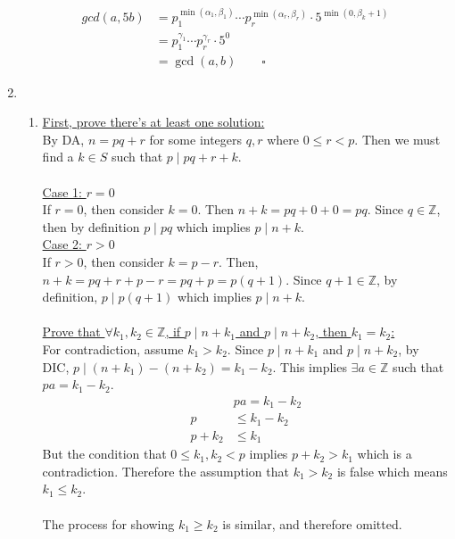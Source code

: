 \documentclass[10pt]{article}
\begin{document}
\begin{enumerate}
    \begin{align*}
        gcd{(a, 5b)} &= p_1^{\min{(\alpha_1, \beta_1)}} \cdots p_r^{\min{(\alpha_r, \beta_r)}} \cdot 5^{\min{(0, \beta_k + 1)}} \\
                    &=  p_1^{\gamma_1} \cdots p_r^{\gamma_r} \cdot 5^0\\
                    &= \gcd{(a, b)} \qquad \square
    \end{align*} 
    \item
    \begin{enumerate}
\item
    \underline{First, prove there's at least one solution:}\\
    By DA, $n = pq + r$ for some integers $q, r$ where $0 \leq r < p$. Then we must find a $k \in S$ such that $p \mid pq + r + k$. \\ \\
    \underline{Case 1: $r = 0$}\\
    If $r = 0$, then consider $k = 0$. Then $n + k = pq + 0 + 0= pq$. Since $q \in \mathbb{Z}$, then by definition $p \mid pq$ which implies $p \mid n + k$.\\
    \underline{Case 2: $r > 0$}\\
    If $r > 0$, then consider $k = p - r$. Then, $n + k = pq + r + p - r = pq + p = p(q+1)$. Since $q+1 \in \mathbb{Z}$, by definition, $p \mid p(q+1)$ which implies $p \mid n + k$.\\
    \\
    \underline{Prove that $\forall k_1, k_2 \in \mathbb{Z}$, if $p \mid n + k_1$ and $p \mid n + k_2$, then $k_1 = k_2$:}\\
    For contradiction, assume $k_1 > k_2$. Since $p \mid n + k_1$ and $p \mid n + k_2$, by DIC, $p \mid (n+k_1) - (n+k_2) = k_1 - k_2$. This implies $\exists a \in \mathbb{Z}$ such that $pa = k_1 - k_2$. 
    \begin{align}
        & pa = k_1 - k_2 \\
        p &\leq k_1 - k_2\\
        p+k_2 &\leq k_1
    \end{align}
    But the condition that $0 \leq k_1, k_2 < p$ implies $p + k_2 > k_1$ which is a contradiction. Therefore the assumption that $k_1 > k_2$ is false which means $k_1 \leq k_2$. 
    \\ \\
    The process for showing $k_1 \geq k_2$ is similar, and therefore omitted. 
    \\ \\

\end{enumerate}
\end{enumerate}
\end{document}
